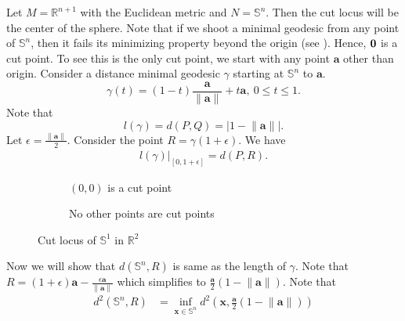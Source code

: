 \begin{eg}\label{eg:Example-cutLocusOfCircle}
    Let $M=\mathbb{R}^{n+1}$ with the Euclidean metric and $N=\mathbb{S}^n$. Then the cut locus will be the center of the sphere. Note that if we shoot a minimal geodesic from any point of $\mathbb{S}^n$, then it fails its minimizing property beyond the origin (see ). Hence, $\bf{0}$ is a cut point. To see this is the only cut point, we start with any point $\mathbf{a}$ other than origin. Consider a distance minimal geodesic $\gamma$ starting at $\mathbb{S}^n$ to $\mathbf{a}$.  
    \begin{equation*}\label{eq:lineJoiningTwoPoints}
        \gamma(t) = (1-t) \frac{\mathbf{a}}{\left\|\mathbf{a}\right\|}+ t \mathbf{a},~0\le t\le 1.
    \end{equation*}
    Note that 
    \begin{displaymath}
        l(\gamma)=d(P,Q) = \left|1-\left\|\mathbf{a}\right\|\right|.
    \end{displaymath}
    Let $\epsilon=\frac{\left\|\mathbf{a}\right\|}{2}$. Consider the point $R=\gamma(1+\epsilon)$. We have
    \begin{align*}
        l(\gamma)\big|_{[0,1+\epsilon]} = d(P,R).
    \end{align*}
    \begin{figure}[!htbp]
        \centering
        \begin{subfigure}{.45\textwidth}
            \caption{$(0,0)$ is a cut point}
            \label{fig:Example-CutLocusCircle}
        \end{subfigure}
        \begin{subfigure}{.45\textwidth}
            \caption{No other points are cut points}
        \end{subfigure}
        \caption{Cut locus of $\mathbb{S}^1$ in $\mathbb{R}^2$}
    \end{figure}
    \noindent Now we will show that $d(\mathbb{S}^n,R)$ is same as the length of $\gamma$. Note that $R=(1+\epsilon)\mathbf{a}-\frac{\epsilon \mathbf{a}}{\left\|\mathbf{a}\right\|}$ which simplifies to $\frac{\mathbf{a}}{2}(1-\left\|\mathbf{a}\right\|) $. Note that 
    \begin{align*}
        d^2(\mathbb{S}^n,R) & = \inf_{\mathbf{x}\in \mathbb{S}^n} d^2 \left(\mathbf{x},\frac{\mathbf{a}}{2}(1-\left\|\mathbf{a}\right\|)\right) 
        \\[1ex]

\end{align*}
\end{eg}
